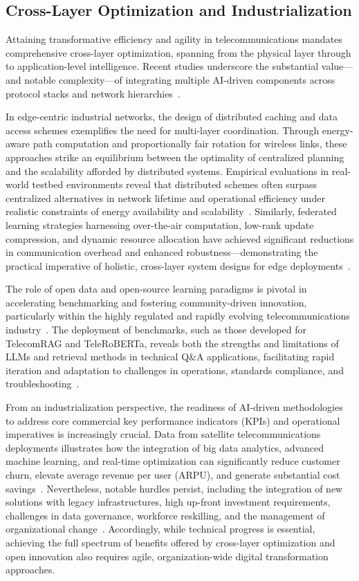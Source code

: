 \documentclass[sigconf]{acmart}
\begin{document}
\subsection{Cross-Layer Optimization and Industrialization}

Attaining transformative efficiency and agility in telecommunications mandates comprehensive cross-layer optimization, spanning from the physical layer through to application-level intelligence. Recent studies underscore the substantial value—and notable complexity—of integrating multiple AI-driven components across protocol stacks and network hierarchies~\cite{ref12, ref14, ref20, ref21, ref24, ref25, ref26, ref29}.

In edge-centric industrial networks, the design of distributed caching and data access schemes exemplifies the need for multi-layer coordination. Through energy-aware path computation and proportionally fair rotation for wireless links, these approaches strike an equilibrium between the optimality of centralized planning and the scalability afforded by distributed systems. Empirical evaluations in real-world testbed environments reveal that distributed schemes often surpass centralized alternatives in network lifetime and operational efficiency under realistic constraints of energy availability and scalability~\cite{ref14}. Similarly, federated learning strategies harnessing over-the-air computation, low-rank update compression, and dynamic resource allocation have achieved significant reductions in communication overhead and enhanced robustness—demonstrating the practical imperative of holistic, cross-layer system designs for edge deployments~\cite{ref12}.

The role of open data and open-source learning paradigms is pivotal in accelerating benchmarking and fostering community-driven innovation, particularly within the highly regulated and rapidly evolving telecommunications industry~\cite{ref11, ref21, ref22, ref23}. The deployment of benchmarks, such as those developed for TelecomRAG and TeleRoBERTa, reveals both the strengths and limitations of LLMs and retrieval methods in technical Q\&A applications, facilitating rapid iteration and adaptation to challenges in operations, standards compliance, and troubleshooting~\cite{ref23, ref29}.

From an industrialization perspective, the readiness of AI-driven methodologies to address core commercial key performance indicators (KPIs) and operational imperatives is increasingly crucial. Data from satellite telecommunications deployments illustrates how the integration of big data analytics, advanced machine learning, and real-time optimization can significantly reduce customer churn, elevate average revenue per user (ARPU), and generate substantial cost savings~\cite{ref49}. Nevertheless, notable hurdles persist, including the integration of new solutions with legacy infrastructures, high up-front investment requirements, challenges in data governance, workforce reskilling, and the management of organizational change~\cite{ref49}. Accordingly, while technical progress is essential, achieving the full spectrum of benefits offered by cross-layer optimization and open innovation also requires agile, organization-wide digital transformation approaches.
\end{document}
